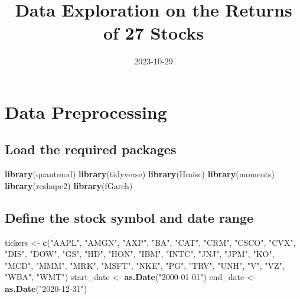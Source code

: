 \documentclass[
]{article}
\title{Data Exploration on the Returns of 27 Stocks}
\author{}
\date{\vspace{-2.5em}2023-10-29}
\newenvironment{Shaded}{\begin{snugshade}}{\end{snugshade}}
\newcommand{\FunctionTok}[1]{\textcolor[rgb]{0.13,0.29,0.53}{\textbf{#1}}}
\newcommand{\NormalTok}[1]{#1}
\newcommand{\OtherTok}[1]{\textcolor[rgb]{0.56,0.35,0.01}{#1}}
\newcommand{\StringTok}[1]{\textcolor[rgb]{0.31,0.60,0.02}{#1}}
\begin{document}
\maketitle

\hypertarget{data-preprocessing}{%
\section{Data Preprocessing}\label{data-preprocessing}}

\hypertarget{load-the-required-packages}{%
\subsection{Load the required
packages}\label{load-the-required-packages}}

\begin{Shaded}
\begin{Highlighting}[]
\FunctionTok{library}\NormalTok{(quantmod)}
\FunctionTok{library}\NormalTok{(tidyverse)}
\FunctionTok{library}\NormalTok{(Hmisc)}
\FunctionTok{library}\NormalTok{(moments)}
\FunctionTok{library}\NormalTok{(reshape2)}
\FunctionTok{library}\NormalTok{(fGarch)}
\end{Highlighting}
\end{Shaded}

\hypertarget{define-the-stock-symbol-and-date-range}{%
\subsection{Define the stock symbol and date
range}\label{define-the-stock-symbol-and-date-range}}

\begin{Shaded}
\begin{Highlighting}[]
\NormalTok{tickers }\OtherTok{\textless{}{-}} \FunctionTok{c}\NormalTok{(}\StringTok{"AAPL"}\NormalTok{, }\StringTok{"AMGN"}\NormalTok{, }\StringTok{"AXP"}\NormalTok{, }\StringTok{"BA"}\NormalTok{, }\StringTok{"CAT"}\NormalTok{, }\StringTok{"CRM"}\NormalTok{, }\StringTok{"CSCO"}\NormalTok{, }\StringTok{"CVX"}\NormalTok{, }\StringTok{"DIS"}\NormalTok{, }\StringTok{"DOW"}\NormalTok{,}
            \StringTok{"GS"}\NormalTok{, }\StringTok{"HD"}\NormalTok{, }\StringTok{"HON"}\NormalTok{, }\StringTok{"IBM"}\NormalTok{, }\StringTok{"INTC"}\NormalTok{, }\StringTok{"JNJ"}\NormalTok{, }\StringTok{"JPM"}\NormalTok{, }\StringTok{"KO"}\NormalTok{, }\StringTok{"MCD"}\NormalTok{, }\StringTok{"MMM"}\NormalTok{,}
            \StringTok{"MRK"}\NormalTok{, }\StringTok{"MSFT"}\NormalTok{, }\StringTok{"NKE"}\NormalTok{, }\StringTok{"PG"}\NormalTok{, }\StringTok{"TRV"}\NormalTok{, }\StringTok{"UNH"}\NormalTok{, }\StringTok{"V"}\NormalTok{, }\StringTok{"VZ"}\NormalTok{, }\StringTok{"WBA"}\NormalTok{, }\StringTok{"WMT"}\NormalTok{)}
\NormalTok{start\_date }\OtherTok{\textless{}{-}} \FunctionTok{as.Date}\NormalTok{(}\StringTok{"2000{-}01{-}01"}\NormalTok{)}
\NormalTok{end\_date }\OtherTok{\textless{}{-}} \FunctionTok{as.Date}\NormalTok{(}\StringTok{"2020{-}12{-}31"}\NormalTok{)}
\end{Highlighting}
\end{Shaded}
\end{document}
